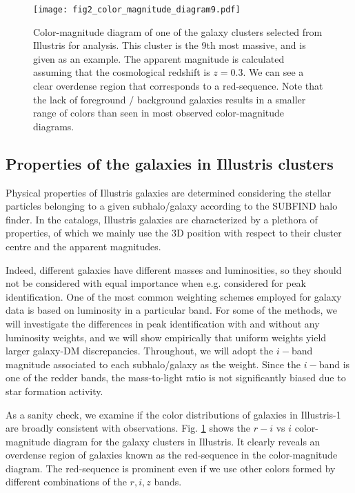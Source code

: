 \documentclass[usenatbib]{mn2e}
\begin{document}
{\begin{figure}
	\centering
	\texttt{[image: fig2\_color\_magnitude\_diagram9.pdf]}
	\caption{Color-magnitude diagram of one of the galaxy clusters selected from Illustris for analysis. This cluster is the 9th most massive, and is given as an example. 
		The apparent magnitude is calculated assuming that 
		the cosmological redshift is $z = 0.3$. 
		We can see a clear overdense region that corresponds to a red-sequence.
		Note that the lack of foreground / background galaxies results in a smaller
		range of colors than seen in most observed color-magnitude diagrams.	
		\label{fig:color_magnitude_diagram}
	} 
\end{figure}

\subsection{Properties of the galaxies in Illustris clusters}
\label{subsec:galaxy_properties}

Physical properties of Illustris galaxies are determined considering the stellar particles belonging to a given subhalo/galaxy according to the {\sc SUBFIND} halo finder. In the catalogs, Illustris galaxies are characterized by a plethora of properties, of which we mainly use the 3D position with respect to their cluster centre and the apparent magnitudes. 

Indeed, different galaxies have different masses and luminosities, so they should not be considered with equal
importance when e.g. considered for peak identification. One of the most common weighting schemes employed for galaxy data is based on luminosity in a particular band. For some of the methods, we will investigate
the differences in peak identification with and without any luminosity weights, and  we will show empirically that uniform
weights yield larger galaxy-DM discrepancies. Throughout, we will adopt the $i-$band magnitude
associated to each subhalo/galaxy as the weight. Since the $i-$band is
one of the redder bands, the mass-to-light ratio is not significantly biased due to star formation activity.

As a sanity check, we examine if the color distributions of galaxies in Illustris-1 are broadly
consistent with observations. Fig. \ref{fig:color_magnitude_diagram} shows the $r-i$ vs $i$ color-magnitude
diagram for the galaxy clusters in Illustris. It clearly reveals an overdense region of galaxies known as the red-sequence in the 
color-magnitude diagram. The red-sequence is prominent even if we
use other colors formed by different combinations of the $r, i, z$ bands.




}
\end{document}
